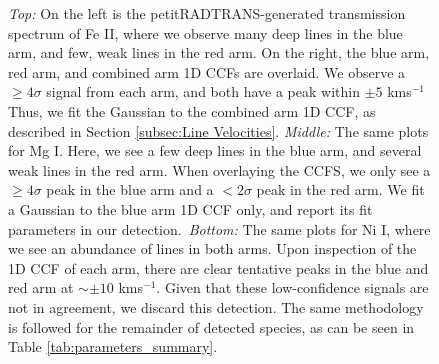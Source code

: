 \documentclass[twocolumn]{aastex631}
\begin{document}
            \begin{figure}
                \centering
                \caption{\textit{Top:} On the left is the petitRADTRANS-generated transmission spectrum of Fe II, where we observe many deep lines in the blue arm, and few, weak lines in the red arm. On the right, the blue arm, red arm, and combined arm 1D CCFs are overlaid. We observe a $\geq4\sigma$ signal from each arm, and both have a peak within $\pm5$ kms$^{-1}$ Thus, we fit the Gaussian to the combined arm 1D CCF, as described in Section \ref{subsec:Line Velocities}. \textit{Middle:} The same plots for Mg I. Here, we see a few deep lines in the blue arm, and several weak lines in the red arm. When overlaying the CCFS, we only see a $\geq4\sigma$ peak in the blue arm and a $<2\sigma$ peak in the red arm. We fit a Gaussian to the blue arm 1D CCF only, and report its fit parameters in our detection.~\textit{Bottom:} The same plots for Ni I, where we see an abundance of lines in both arms. Upon inspection of the 1D CCF of each arm, there are clear tentative peaks in the blue and red arm at $\sim\pm 10$ kms$^{-1}$. Given that these low-confidence signals are not in agreement, we discard this detection. The same methodology is followed for the remainder of detected species, as can be seen in Table \ref{tab:parameters_summary}.}
                \label{fig:detection-methodology-example}
            \end{figure}
\end{document}
